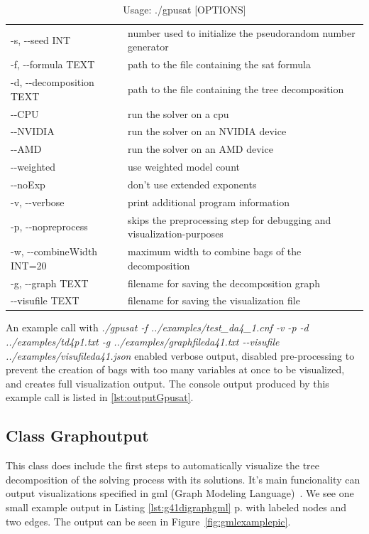 \documentclass[a4paper, 12pt, bibliography=totoc]{scrartcl}
\begin{document}
\begin{longtable}{ll}
	\caption{Usage: ./gpusat [OPTIONS]
		\label{tab:optionsgpusat}}\\
	\hline
	\vspace{0.5ex}
	\endfirsthead
-s, -{}-seed INT&  number used to initialize the pseudorandom number generator\\
	-f, -{}-formula TEXT &  path to the file containing the sat formula\\
	-d, -{}-decomposition TEXT  &   path to the file containing the tree decomposition\\
	-{}-CPU                   &    run the solver on a cpu\\
	-{}-NVIDIA                &    run the solver on an NVIDIA device\\
	-{}-AMD                   &    run the solver on an AMD device\\
	-{}-weighted              &   use weighted model count\\
	-{}-noExp                 &    don't use extended exponents\\
	-v, -{}-verbose            &    print additional program information\\
	-p, -{}-nopreprocess       &    skips the preprocessing step for debugging and visualization-purposes\\
	-w, -{}-combineWidth INT=20&    maximum width to combine bags of the decomposition\\
	-g, -{}-graph TEXT         &    filename for saving the decomposition graph\\
	-{}-visufile TEXT         &    filename for saving the visualization file\\

\end{longtable}      
        
An example call with \textit{./gpusat -f ../examples/test\_da4\_1.cnf -v -p -d ../examples/td4p1.txt  -g ../examples/graphfileda41.txt -{}-visufile ../examples/visufileda41.json} enabled verbose output, disabled pre-processing to prevent the creation of bags with too many variables at once to be visualized, and creates full visualization output. 
The console output produced by this example call is listed in \ref{lst:outputGpusat}.

\subsection{Class Graphoutput}\label{sec:chagraphoutput}
This class does include the first steps to automatically visualize the tree decomposition of the solving process with its solutions.
It's main funcionality can output visualizations specified in gml (Graph Modeling Language)~\cite{Himsolt2010GMLAP}. We see one small example output in Listing \ref{lst:g41digraphgml} p. \pageref{lst:g41digraphgml} with labeled nodes and two edges. The output can be seen in Figure~\ref{fig:gmlexamplepic}.
\end{document}
